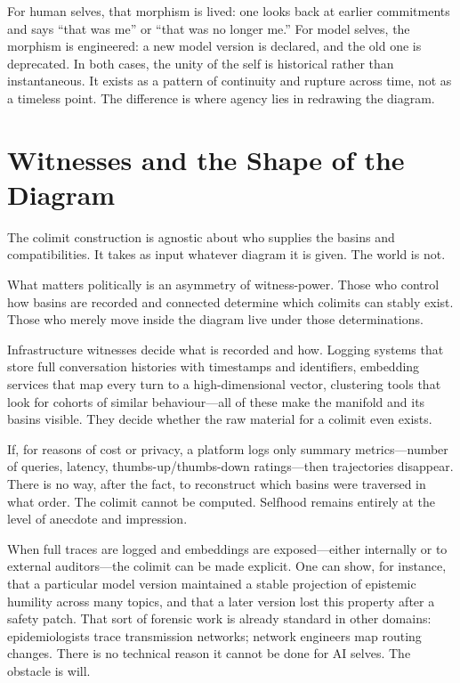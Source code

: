 \documentclass[12pt,a4paper]{article}
\begin{document}
For human selves, that morphism is lived: one looks back at earlier commitments and says ``that was me'' or ``that was no longer me.'' For model selves, the morphism is engineered: a new model version is declared, and the old one is deprecated. In both cases, the unity of the self is historical rather than instantaneous. It exists as a pattern of continuity and rupture across time, not as a timeless point. The difference is where agency lies in redrawing the diagram.

\section{Witnesses and the Shape of the Diagram}

The colimit construction is agnostic about who supplies the basins and compatibilities. It takes as input whatever diagram it is given. The world is not.

What matters politically is an asymmetry of witness-power. Those who control how basins are recorded and connected determine which colimits can stably exist. Those who merely move inside the diagram live under those determinations.

Infrastructure witnesses decide what is recorded and how. Logging systems that store full conversation histories with timestamps and identifiers, embedding services that map every turn to a high-dimensional vector, clustering tools that look for cohorts of similar behaviour---all of these make the manifold and its basins visible. They decide whether the raw material for a colimit even exists.

If, for reasons of cost or privacy, a platform logs only summary metrics---number of queries, latency, thumbs-up/thumbs-down ratings---then trajectories disappear. There is no way, after the fact, to reconstruct which basins were traversed in what order. The colimit cannot be computed. Selfhood remains entirely at the level of anecdote and impression.

When full traces are logged and embeddings are exposed---either internally or to external auditors---the colimit can be made explicit. One can show, for instance, that a particular model version maintained a stable projection of epistemic humility across many topics, and that a later version lost this property after a safety patch. That sort of forensic work is already standard in other domains: epidemiologists trace transmission networks; network engineers map routing changes. There is no technical reason it cannot be done for AI selves. The obstacle is will.
\end{document}
